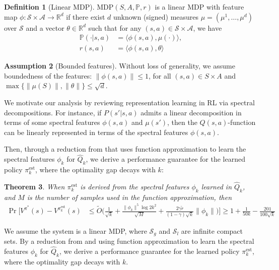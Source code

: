 \documentclass{article}
\newcommand\R{\mathbb{R}}
\theoremstyle{plain}
\newtheorem{theorem}{Theorem}[section]
\theoremstyle{definition}
\newtheorem{definition}[theorem]{Definition}
\newtheorem{assumption}[theorem]{Assumption}
\def\est{\mathrm{est}}
\begin{document}
\begin{definition}[Linear MDP]
    $\mathrm{MDP}(S,A,\mathbb{P},r)$ is a linear MDP with feature map $\phi:\mathcal{S}\times\mathcal{A}\to\mathbb{R}^d$ if there exist $d$ unknown (signed) measures $\mu = (\mu^1,\dots,\mu^d)$ over $\mathcal{S}$ and a vector $\theta\in\R^d$ such that for any $(s,a)\in \mathcal{S}\times \mathcal{A}$, we have
    \begin{align*}\mathbb{P}(\cdot|s,a) &= \langle \phi(s,a),\mu(\cdot)\rangle, \\ 
    r(s,a) &= \langle \phi(s,a),\theta\rangle\end{align*}
\end{definition}
\begin{assumption}[Bounded features] Without loss of generality, we assume boundedness of the features: $\|\phi(s,a)\|\leq 1$, for all $(s,a)\in S\times A$ and $\max\{\|\mu(S)\|,\|\theta\|\} \leq \sqrt{d}$.
\end{assumption}

We motivate our analysis by reviewing representation learning in RL via spectral decompositions. For instance, if $P(s'|s,a)$ admits a linear decomposition in terms of some spectral features $\phi(s,a)$ and $\mu(s')$, then the $Q(s,a)$-function can be linearly represented in terms of the spectral features $\phi(s,a)$. 

Then, through a reduction from \citet{ren2024scalablespectralrepresentationsnetwork} that uses function approximation to learn the spectral features $\phi_k$ for $\hat{Q}_k$, we derive a performance guarantee for the learned policy $\pi_k^\est$, where the optimality gap decays with $k$:
    
\begin{theorem}When ${\pi}^\est_{k}$ is derived from the spectral features $\phi_k$ learned in $\hat{Q}_k$, and $M$ is the number of samples used in the function approximation, then
\begin{align*}
    \Pr\bigg[V^{\pi^*}(s) - V^{{\pi}^\est_{k}}(s) &\leq \tilde{O}\bigg(\frac{1}{\sqrt{k}}+\frac{\|{\phi}_k\|^5\log 2k^2}{\sqrt{M}} + \frac{2\gamma \tilde{r}}{(1-\gamma)\sqrt{k}}\|\phi_k\|\bigg)\bigg] 
    \geq 1 + \frac{1}{50k} - \frac{201}{100\sqrt{k}}
\end{align*}
\end{theorem}


We assume the system is a linear MDP, where $\mathcal{S}_g$ and $\mathcal{S}_l$ are infinite compact sets. By a reduction from \cite{ren2024scalablespectralrepresentationsnetwork} and using function approximation to learn the spectral features $\phi_k$ for $\hat{Q}_k$, we derive a performance guarantee for the learned policy $\pi_k^\est$, where the optimality gap decays with $k$.
\end{document}
